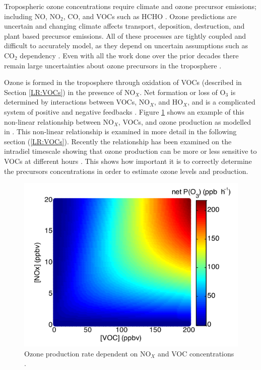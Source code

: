     Tropospheric ozone concentrations require climate and ozone precursor emissions; including NO, NO$_2$, CO, and VOCs such as HCHO \parencite{Atkinson2000, Young2013, Marvin2017}.
    Ozone predictions are uncertain and changing climate affects transport, deposition, destruction, and plant based precursor emissions.
    All of these processes are tightly coupled and difficult to accurately model, as they depend on uncertain assumptions such as CO$_2$ dependency \parencite{Young2013}.
    Even with all the work done over the prior decades there remain large uncertainties about ozone precursors in the troposphere \parencite{Mazzuca2016}.
    
    
    Ozone is formed in the troposphere through oxidation of VOCs (described in Section \ref{LR:VOCs}) in the presence of NO$_X$.
    Net formation or loss of O$_3$ is determined by interactions between VOCs, NO$_X$, and HO$_X$, and is a complicated system of positive and negative feedbacks \parencite{Atkinson2000}.
    Figure \ref{LR:VOCs:fig_NOXVOCOzone} shows an example of this non-linear relationship between NO$_X$, VOCs, and ozone production as modelled in \textcite{Mazzuca2016}.
    This non-linear relationship is examined in more detail in the following section (\ref{LR:VOCs}).
    Recently the relationship has been examined on the intradiel timescale showing that ozone production can be more or less sensitive to VOCs at different hours \parencite{Mazzuca2016}.
    This shows how important it is to correctly determine the precursors concentrations in order to estimate ozone levels and production.
    
    \begin{figure}
      \includegraphics[width=.75\textwidth]{Figures/Mazzuca2016_NOxVOCOzone.png}
      \caption{Ozone production rate dependent on NO$_X$ and VOC concentrations \parencite{Mazzuca2016}.}
      \label{LR:VOCs:fig_NOXVOCOzone}
    \end{figure}
    
